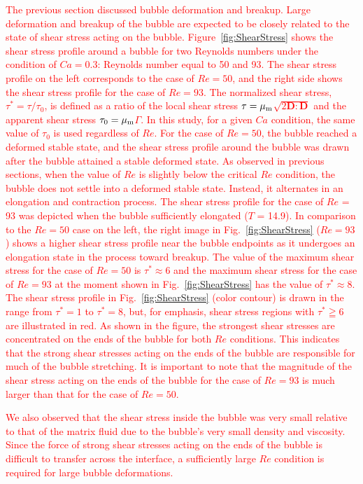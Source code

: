 \documentclass{elsarticle}
\newcommand{\vv}{\mathbf}
\newcommand{\bmD}{\vv{D}}
\begin{document}
\textcolor{red}
{
The previous section discussed bubble deformation and breakup. Large deformation and breakup of the bubble are expected to be closely related to the state of shear stress acting on the bubble.  Figure~\ref{fig:ShearStress} shows the shear stress profile around a bubble for two Reynolds numbers under the condition of $Ca = 0.3$: Reynolds number equal to 50 and 93.  The shear stress profile on the left corresponds to the case of $Re = 50$, and the right side shows the shear stress profile for the case of $Re = 93$.  The normalized shear stress, $\tau^{\ast} = \tau / \tau_{0}$, is defined as a ratio of the local shear stress $\tau = \mu_{\rm m}$$\sqrt{2\bmD:\bmD}$ and the apparent shear stress $\tau_{0} = \mu_{\rm m}$$\mathit{\Gamma}$.  In this study, for a given $Ca$ condition, the same value of $\tau_{0}$ is used regardless of $Re$.  For the case of $Re = 50$, the bubble reached a deformed stable state, and the shear stress profile around the bubble was drawn after the bubble attained a stable deformed state.  As observed in previous sections, when the value of $Re$ is slightly below the critical $Re$ condition, the bubble does not settle into a deformed stable state. Instead, it alternates in an elongation and contraction process.  The shear stress profile for the case of $Re$ = 93 was depicted when the bubble sufficiently elongated ($T$ = 14.9).  In comparison to the $Re=50$ case on the left, the right image in Fig.~\ref{fig:ShearStress} ($Re=93$) shows a higher shear stress profile near the bubble endpoints as it undergoes an elongation state in the process toward breakup.  The value of the maximum shear stress for the case of $Re = 50$ is $\tau ^{\ast} \approx 6$ and the maximum shear stress for the case of $Re = 93$ at the moment shown in Fig.~\ref{fig:ShearStress} has the value of $\tau ^{\ast} \approx 8$.  The shear stress profile in Fig.~\ref{fig:ShearStress} (color contour) is drawn in the range from $\tau^{\ast} = 1$ to $\tau ^{\ast} = 8$, but, for emphasis, shear stress regions with $\tau ^{\ast} \geqq 6$ are illustrated in red.  As shown in the figure, the strongest shear stresses are concentrated on the ends of the bubble for both $Re$ conditions.  This indicates that the strong shear stresses acting on the ends of the bubble are responsible for much of the bubble stretching.  It is important to note that the magnitude of the shear stress acting on the ends of the bubble for the case of $Re = 93$ is much larger than that for the case of $Re = 50$.  
}
\par
\textcolor{red}
{
We also observed that the shear stress inside the bubble was very small relative to that of the matrix fluid due to the bubble's very small density and viscosity. Since the force of strong shear stresses acting on the ends of the bubble is difficult to transfer across the interface, a sufficiently large $Re$ condition is required for large bubble deformations.
}
\end{document}
